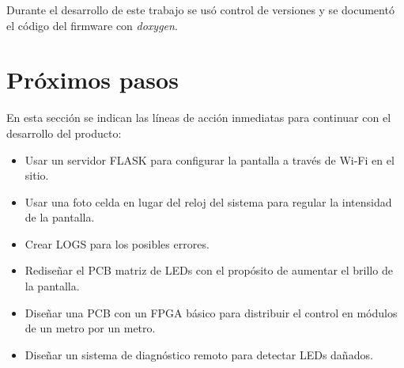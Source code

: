 Durante el desarrollo de este trabajo se usó control de versiones y se documentó el código del firmware con \textit{doxygen}.



\section{Próximos pasos}

En esta sección se indican las líneas de acción inmediatas para continuar con el desarrollo del producto:
\begin{itemize}
\item Usar un servidor FLASK para configurar la pantalla a través de Wi-Fi en el sitio.
\item Usar una foto celda en lugar del reloj del sistema para regular la intensidad de la pantalla.
\item Crear LOGS para los posibles errores.
\item Rediseñar el PCB matriz de LEDs con el propósito de aumentar el brillo de la pantalla.
\item Diseñar una PCB con un FPGA básico para distribuir el control en módulos de un metro por un metro.
\item Diseñar un sistema de diagnóstico remoto para detectar LEDs dañados.
\end{itemize}
